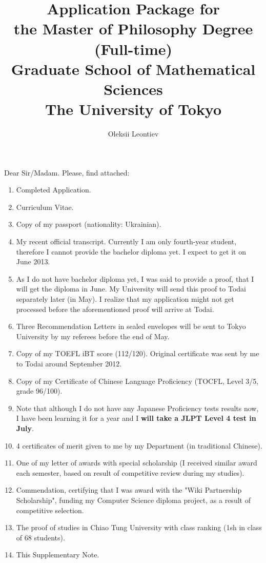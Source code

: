 \documentclass[8pt]{article} %
\title{Application Package for\\the Master of Philosophy Degree (Full-time)\\ Graduate School of Mathematical Sciences
 \\The University of Tokyo}
\author{Oleksii Leontiev}
\begin{document}
\begin{CJK}{UTF8}{bsmi}
\maketitle
\end{CJK}

Dear Sir/Madam. Please, find attached:
\begin{enumerate}
	\item{Completed Application.}%
	\item{Curriculum Vitae.}%
	\item{Copy of my passport (nationality: Ukrainian).}
	\item{My recent official transcript. Currently I am only fourth-year student, therefore I cannot provide the bachelor diploma yet.
		I expect to get it on June 2013.}
	\item{As I do not have bachelor diploma yet, I was said to provide a proof, that I will get the diploma in June. My University {will
		send this proof to Todai} separately later (in May).
		I realize that my application might not get processed before the aforementioned proof will arrive at Todai.}
	\item{Three Recommendation Letters in sealed envelopes will be sent to Tokyo University by my referees before the end of May.}
	\item{Copy of my TOEFL iBT score (112/120). Original certificate was sent by me to Todai around September 2012.}
	\item{Copy of my Certificate of Chinese Language Proficiency (TOCFL, Level 3/5, grade 96/100).}
	\item{Note that although I do not have any Japanese Proficiency tests results now, I have been learning it for a year and I \textbf{will take
		a JLPT Level 4 test in July}.}
	\item{4 certificates of merit given to me by my Department (in traditional Chinese).}
	\item{One of my letter of awards with special scholarship (I received similar award each semester, based on result of competitive review during my studies).}
	\item{Commendation, certifying that I was award with the "Wiki Partnership Scholarship", funding my Computer Science diploma project, as a result of competitive
		selection.}
	\item{The proof of studies in Chiao Tung University with class ranking (1sh in class of 68 students).}
	\item{This Supplementary Note.}
\end{enumerate}
\end{document}
